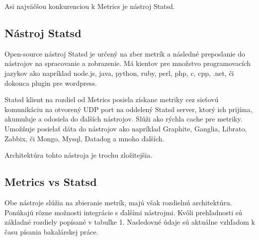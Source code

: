 \documentclass[a4paper, usesections, upjsfrontpage, thesismargins, thesislinespacing, twoside]{rnthesissvk}
\begin{document}
Asi najväčšou konkurenciou k Metrics je nástroj Statsd.


\subsection{Nástroj Statsd}

Open-source nástroj Statsd je určený na zber metrík a následné preposlanie do nástrojov na spracovanie a zobrazenie.
Má kientov pre množstvo programovacích jazykov ako napríklad node.js, java, python, ruby, perl, php, c, cpp, .net, či dokonca plugin pre wordpress. 

Statsd klient na rozdiel od Metrics posiela získane metriky cez sieťovú komunikáciu na otvorený UDP port na oddelený Statsd server, ktorý ich prijíma, akumuluje a odosiela do ďalších nástrojov. 
Slúži ako rýchla cache pre metriky. 
Umožňuje posielať dáta do nástrojov ako napríklad Graphite, Ganglia, Librato, Zabbix, či Mongo, Mysql, Datadog a mnoho ďalších.

Architektúra tohto nástroja je trochu zložitejšia.


\subsection{Metrics vs Statsd}

Obe nástroje slúžia na zbieranie metrík, majú však rozdielnú architektúru. 
Ponúkajú rôzne možnosti integrácie s ďalšími nástrojmi. 
Kvôli prehľadnosti sú základné rozdiely popísané v tabuľke 1.
Nasledovné údaje sú aktuálne vzhľadom k času písania bakalárskej práce.
\end{document}
